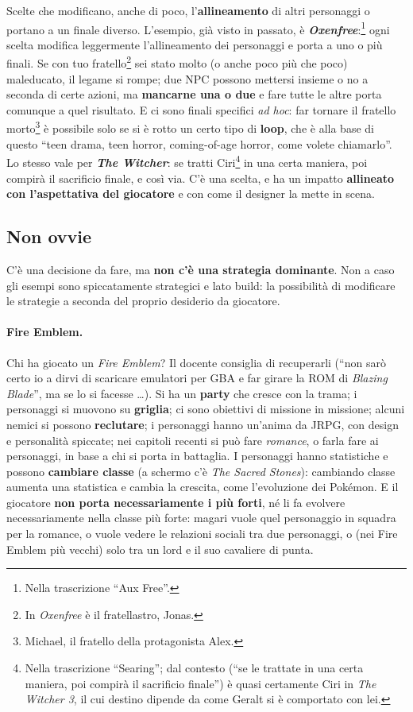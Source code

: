 Scelte che modificano, anche di poco, l'\textbf{allineamento} di altri
personaggi o portano a un finale diverso. L'esempio, già visto in passato,
è \textbf{\emph{Oxenfree}}:\footnote{Nella trascrizione ``Aux Free''.}
ogni scelta modifica leggermente l'allineamento dei personaggi e porta a uno
o più finali. Se con tuo fratello\footnote{In \emph{Oxenfree} è il
fratellastro, Jonas.} sei stato molto (o anche poco più che poco)
maleducato, il legame si rompe; due NPC possono mettersi insieme o no a
seconda di certe azioni, ma \textbf{mancarne una o due} e fare tutte le
altre porta comunque a quel risultato. E ci sono finali specifici
\emph{ad hoc}: far tornare il fratello morto\footnote{Michael, il fratello
della protagonista Alex.} è possibile solo se si è rotto un certo tipo di
\textbf{loop}, che è alla base di questo ``teen drama, teen horror,
coming-of-age horror, come volete chiamarlo''. Lo stesso vale per
\textbf{\emph{The Witcher}}: se tratti Ciri\footnote{Nella trascrizione
``Searing''; dal contesto (``se le trattate in una certa maniera, poi
compirà il sacrificio finale'') è quasi certamente Ciri in \emph{The Witcher
3}, il cui destino dipende da come Geralt si è comportato con lei.} in una
certa maniera, poi compirà il sacrificio finale, e così via. C'è una scelta,
e ha un impatto \textbf{allineato con l'aspettativa del giocatore} e con come
il designer la mette in scena.

\subsection{Non ovvie}

C'è una decisione da fare, ma \textbf{non c'è una strategia dominante}. Non
a caso gli esempi sono spiccatamente strategici e lato build: la possibilità
di modificare le strategie a seconda del proprio desiderio da giocatore.

\paragraph{Fire Emblem.} Chi ha giocato un \emph{Fire Emblem}? Il docente
consiglia di recuperarli (``non sarò certo io a dirvi di scaricare emulatori
per GBA e far girare la ROM di \emph{Blazing Blade}'', ma se lo si facesse
\ldots). Si ha un \textbf{party} che cresce con la trama; i personaggi si
muovono su \textbf{griglia}; ci sono obiettivi di missione in missione;
alcuni nemici si possono \textbf{reclutare}; i personaggi hanno un'anima da
JRPG, con design e personalità spiccate; nei capitoli recenti si può fare
\emph{romance}, o farla fare ai personaggi, in base a chi si porta in
battaglia. I personaggi hanno statistiche e possono \textbf{cambiare classe}
(a schermo c'è \emph{The Sacred Stones}): cambiando classe aumenta una
statistica e cambia la crescita, come l'evoluzione dei Pokémon. E il
giocatore \textbf{non porta necessariamente i più forti}, né li fa evolvere
necessariamente nella classe più forte: magari vuole quel personaggio in
squadra per la romance, o vuole vedere le relazioni sociali tra due
personaggi, o (nei Fire Emblem più vecchi) solo tra un lord e il suo
cavaliere di punta.

